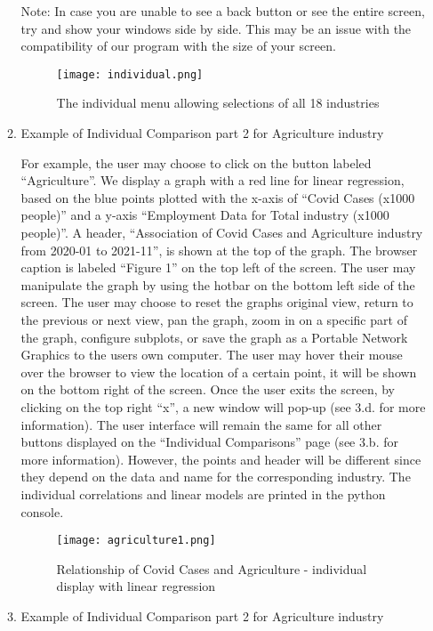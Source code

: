 \documentclass[fontsize=11pt]{article}
\begin{document}
\begin{enumerate}
\begin{enumerate}
Note: In case you are unable to see a back button or see the entire screen, try and show your windows side by side. This may be an issue with the compatibility of our program with the size of your screen.

\begin{figure}[!ht]
  \caption{The individual menu allowing selections of all 18 industries}
\centering
\texttt{[image: individual.png]}
\end{figure}

\raggedright
\newpage

\item Example of Individual Comparison part 2 for Agriculture industry

For example, the user may choose to click on the button labeled ``Agriculture”. We display a graph with a red line for linear regression, based on the blue points plotted with the x-axis of ``Covid Cases (x1000 people)” and a y-axis ``Employment Data for Total industry (x1000 people)”. A header, ``Association of Covid Cases and Agriculture industry from 2020-01 to 2021-11”, is shown at the top of the graph. The browser caption is labeled ``Figure 1” on the top left of the screen. The user may manipulate the graph by using the hotbar on the bottom left side of the screen. The user may choose to reset the graphs original view, return to the previous or next view, pan the graph, zoom in on a specific part of the graph, configure subplots, or save the graph as a Portable Network Graphics to the users own computer. The user may hover their mouse over the browser to view the location of a certain point, it will be shown on the bottom right of the screen. Once the user exits the screen, by clicking on the top right ``x”, a new window will pop-up (see 3.d. for more information). The user interface will remain the same for all other buttons displayed on the ``Individual Comparisons” page (see 3.b. for more information). However, the points and header will be different since they depend on the data and name for the corresponding industry. The individual correlations and linear models are printed in the python console.

\begin{figure}[h!]
  \caption{Relationship of Covid Cases and Agriculture - individual display with linear regression}
    \centering
    \texttt{[image: agriculture1.png]}
\end{figure}

\raggedright

\item Example of Individual Comparison part 2 for Agriculture industry


\end{enumerate}
\end{enumerate}
\end{document}
